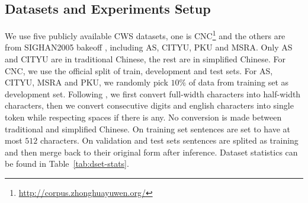 \documentclass[11pt]{article}
\begin{document}

\subsection{Datasets and Experiments Setup}\label{sec:hps}

We use five publicly available CWS datasets, one is CNC\footnote{\url{http://corpus.zhonghuayuwen.org/}} and the others are from SIGHAN2005 bakeoff \cite{emerson-2005-second}, including AS, CITYU, PKU and MSRA.
Only AS and CITYU are in traditional Chinese, the rest are in simplified Chinese.
For CNC, we use the official split of train, development and test sets.
For AS, CITYU, MSRA and PKU, we randomly pick \(10\%\) of data from training set as development set.
Following \cite{cai-etal-2017-fast}, we first convert full-width characters into half-width characters, then we convert consecutive digits and english characters into single token while respecting spaces if there is any.
No conversion is made between traditional and simplified Chinese.
On training set sentences are set to have at most \(512\) characters.
On validation and test sets sentences are splited as training and then merge back to their original form after inference.
Dataset statistics can be found in Table~\ref{tab:dset-stats}.
\end{document}

